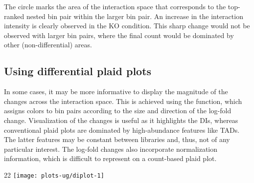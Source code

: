 \documentclass{report}\usepackage[]{graphicx}\usepackage[usenames,dvipsnames]{color}
\makeatletter
\def\maxwidth{ %
  \ifdim\Gin@nat@width>\linewidth
    \linewidth
  \else
    \Gin@nat@width
  \fi
}
\newcommand{\hlnum}[1]{\textcolor[rgb]{0.816,0.125,0.439}{#1}}%
\newcommand{\hlstr}[1]{\textcolor[rgb]{0.251,0.627,0.251}{#1}}%
\newcommand{\hlopt}[1]{\textcolor[rgb]{0,0,0}{#1}}%
\newcommand{\hlstd}[1]{\textcolor[rgb]{0.251,0.251,0.251}{#1}}%
\newcommand{\hlkwb}[1]{\textcolor[rgb]{0,0,0}{#1}}%
\newcommand{\hlkwc}[1]{\textcolor[rgb]{0.251,0.251,0.251}{#1}}%
\newcommand{\hlkwd}[1]{\textcolor[rgb]{0.878,0.439,0.125}{#1}}%
\newenvironment{knitrout}{}{} %
\makeatother
\begin{document}
The circle marks the area of the interaction space that corresponds to the top-ranked nested bin pair within the  larger bin pair.
An increase in the interaction intensity is clearly observed in the KO condition.
This sharp change would not be observed with larger bin pairs, where the final count would be dominated by other (non-differential) areas.

\subsection{Using differential plaid plots}
In some cases, it may be more informative to display the magnitude of the changes across the interaction space.
This is achieved using the  function, which assigns colors to bin pairs according to the size and direction of the log-fold change.
Visualization of the changes is useful as it highlights the DIs, whereas conventional plaid plots are dominated by high-abundance features like TADs.
The latter features may be constant between libraries and, thus, not of any particular interest.
The log-fold changes also incorporate normalization information, which is difficult to represent on a count-based plaid plot.

\begin{knitrout}
\color{fgcolor}\begin{adjustwidth}{2\fltoffset}{2\fltoffset}
\texttt{[image: plots-ug/diplot-1]} \end{adjustwidth}
\end{knitrout}
\end{document}
